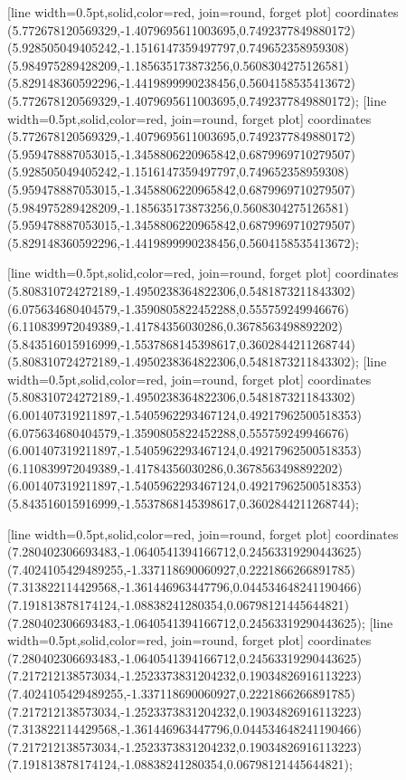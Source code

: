 [line width=0.5pt,solid,color=red, join=round, forget plot] coordinates {(5.772678120569329,-1.4079695611003695,0.7492377849880172) (5.928505049405242,-1.1516147359497797,0.749652358959308) (5.984975289428209,-1.185635173873256,0.5608304275126581) (5.829148360592296,-1.4419899990238456,0.5604158535413672) (5.772678120569329,-1.4079695611003695,0.7492377849880172)};
[line width=0.5pt,solid,color=red, join=round, forget plot] coordinates {(5.772678120569329,-1.4079695611003695,0.7492377849880172) (5.959478887053015,-1.3458806220965842,0.6879969710279507) (5.928505049405242,-1.1516147359497797,0.749652358959308) (5.959478887053015,-1.3458806220965842,0.6879969710279507) (5.984975289428209,-1.185635173873256,0.5608304275126581) (5.959478887053015,-1.3458806220965842,0.6879969710279507) (5.829148360592296,-1.4419899990238456,0.5604158535413672)};

[line width=0.5pt,solid,color=red, join=round, forget plot] coordinates {(5.808310724272189,-1.4950238364822306,0.5481873211843302) (6.075634680404579,-1.3590805822452288,0.555759249946676) (6.110839972049389,-1.41784356030286,0.3678563498892202) (5.843516015916999,-1.5537868145398617,0.3602844211268744) (5.808310724272189,-1.4950238364822306,0.5481873211843302)};
[line width=0.5pt,solid,color=red, join=round, forget plot] coordinates {(5.808310724272189,-1.4950238364822306,0.5481873211843302) (6.001407319211897,-1.5405962293467124,0.49217962500518353) (6.075634680404579,-1.3590805822452288,0.555759249946676) (6.001407319211897,-1.5405962293467124,0.49217962500518353) (6.110839972049389,-1.41784356030286,0.3678563498892202) (6.001407319211897,-1.5405962293467124,0.49217962500518353) (5.843516015916999,-1.5537868145398617,0.3602844211268744)};

[line width=0.5pt,solid,color=red, join=round, forget plot] coordinates {(7.280402306693483,-1.0640541394166712,0.24563319290443625) (7.4024105429489255,-1.337118690060927,0.2221866266891785) (7.313822114429568,-1.361446963447796,0.044534648241190466) (7.191813878174124,-1.08838241280354,0.06798121445644821) (7.280402306693483,-1.0640541394166712,0.24563319290443625)};
[line width=0.5pt,solid,color=red, join=round, forget plot] coordinates {(7.280402306693483,-1.0640541394166712,0.24563319290443625) (7.217212138573034,-1.2523373831204232,0.19034826916113223) (7.4024105429489255,-1.337118690060927,0.2221866266891785) (7.217212138573034,-1.2523373831204232,0.19034826916113223) (7.313822114429568,-1.361446963447796,0.044534648241190466) (7.217212138573034,-1.2523373831204232,0.19034826916113223) (7.191813878174124,-1.08838241280354,0.06798121445644821)};

